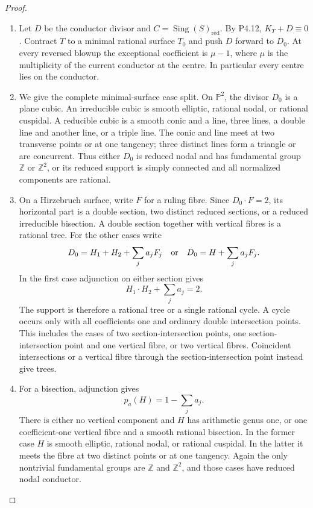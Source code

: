 \begin{proof}

\begin{enumerate}[label={$\langle1\rangle$\arabic*.},leftmargin=*]
\item Let $D$ be the conductor divisor and
$C=\operatorname{Sing}(S)_{\mathrm{red}}$. By P4.12,
$K_T+D\equiv0$. Contract $T$ to a minimal rational surface
$T_0$ and push $D$ forward to $D_0$. At every reversed
blowup the exceptional coefficient is $\mu-1$, where
$\mu$ is the multiplicity of the current conductor at the
centre. In particular every centre lies on the conductor.

\item We give the complete minimal-surface case split. On
$\mathbb P^2$, the divisor $D_0$ is a plane cubic. An
irreducible cubic is smooth elliptic, rational nodal, or
rational cuspidal. A reducible cubic is a smooth conic
and a line, three lines, a double line and another line,
or a triple line. The conic and line meet at two
transverse points or at one tangency; three distinct
lines form a triangle or are concurrent. Thus either
$D_0$ is reduced nodal and has fundamental group
$\mathbb Z$ or $\mathbb Z^2$, or its reduced support is
simply connected and all normalized components are
rational.

\item On a Hirzebruch surface, write $F$ for a ruling fibre.
Since $D_0\cdot F=2$, its horizontal part is a double
section, two distinct reduced sections, or a reduced
irreducible bisection. A double section together with
vertical fibres is a rational tree. For the other cases
write
\[
 D_0=H_1+H_2+\sum_j a_jF_j
 \quad\hbox{or}\quad
 D_0=H+\sum_j a_jF_j.
\]
In the first case adjunction on either section gives
\[
 H_1\cdot H_2+\sum_j a_j=2.
\]
The support is therefore a rational tree or a single
rational cycle. A cycle occurs only with all coefficients
one and ordinary double intersection points. This
includes the cases of two section-intersection points,
one section-intersection point and one vertical fibre,
or two vertical fibres. Coincident intersections or a
vertical fibre through the section-intersection point
instead give trees.

\item For a bisection, adjunction gives
\[
 p_a(H)=1-\sum_j a_j.
\]
There is either no vertical component and $H$ has
arithmetic genus one, or one coefficient-one vertical
fibre and a smooth rational bisection. In the former
case $H$ is smooth elliptic, rational nodal, or rational
cuspidal. In the latter it meets the fibre at two distinct
points or at one tangency. Again the only nontrivial
fundamental groups are $\mathbb Z$ and $\mathbb Z^2$,
and those cases have reduced nodal conductor.


\end{enumerate}
\end{proof}

